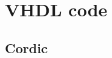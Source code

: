 \chapter{VHDL code}


\section{Cordic}

\begin{code}
    \inputminted{vhdl}{listings/03/CORDIC.vhd}
    \label{code:vhdl}
\end{code}

\begin{code}
    \inputminted{vhdl}{listings/03/ATAN_LUT.vhd}
    \label{code:lut}
\end{code}
